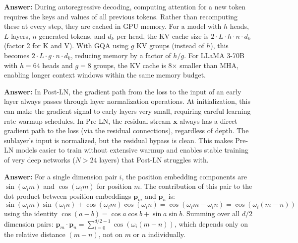 \documentclass[11pt, a4paper]{article}
\begin{document}
\begin{notebox}
\textbf{Answer:} During autoregressive decoding, computing attention for a new token requires the keys and values of all previous tokens. Rather than recomputing these at every step, they are cached in GPU memory. For a model with $h$ heads, $L$ layers, $n$ generated tokens, and $d_k$ per head, the KV cache size is $2 \cdot L \cdot h \cdot n \cdot d_k$ (factor 2 for K and V). With GQA using $g$ KV groups (instead of $h$), this becomes $2 \cdot L \cdot g \cdot n \cdot d_k$, reducing memory by a factor of $h/g$. For LLaMA 3-70B with $h=64$ heads and $g=8$ groups, the KV cache is 8$\times$ smaller than MHA, enabling longer context windows within the same memory budget.
\end{notebox}

\begin{notebox}
\textbf{Answer:} In Post-LN, the gradient path from the loss to the input of an early layer always passes through layer normalization operations. At initialization, this can make the gradient signal to early layers very small, requiring careful learning rate warmup schedules. In Pre-LN, the residual stream $\mathbf{x}$ always has a direct gradient path to the loss (via the residual connections), regardless of depth. The sublayer's input is normalized, but the residual bypass is clean. This makes Pre-LN models easier to train without extensive warmup and enables stable training of very deep networks ($N > 24$ layers) that Post-LN struggles with.
\end{notebox}

\begin{notebox}
\textbf{Answer:} For a single dimension pair $i$, the position embedding components are $\sin(\omega_i m)$ and $\cos(\omega_i m)$ for position $m$. The contribution of this pair to the dot product between position embeddings $\mathbf{p}_m$ and $\mathbf{p}_n$ is:
\[
\sin(\omega_i m)\sin(\omega_i n) + \cos(\omega_i m)\cos(\omega_i n) = \cos(\omega_i m - \omega_i n) = \cos(\omega_i (m-n))
\]
using the identity $\cos(a-b) = \cos a \cos b + \sin a \sin b$. Summing over all $d/2$ dimension pairs: $\mathbf{p}_m \cdot \mathbf{p}_n = \sum_{i=0}^{d/2-1} \cos(\omega_i(m-n))$, which depends only on the relative distance $(m-n)$, not on $m$ or $n$ individually.
\end{notebox}
\end{document}
